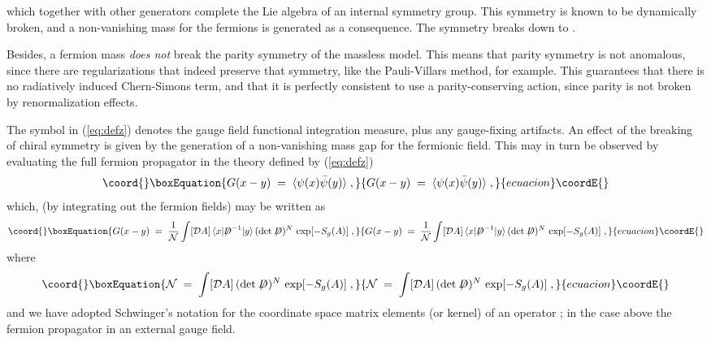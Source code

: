 \documentclass[12pt,a4paper]{article} \usepackage[latin1] {inputenc}
\begin{document}
which together with other generators complete the Lie algebra of an
internal \coordHE{} symmetry group.  This symmetry is known to be
dynamically broken\cite{Pisarski:dj}, and a non-vanishing mass for the
fermions is generated as a consequence. The \coordHE{} symmetry breaks
down to \coordHE{}.

Besides, a fermion mass {\em does not\/} break the parity symmetry of
the massless model.  This means that parity symmetry is not anomalous,
since there are regularizations that indeed preserve that symmetry,
like the Pauli-Villars method, for example.  This guarantees that
there is no radiatively induced Chern-Simons term, and that it is
perfectly consistent to use a parity-conserving action, since parity
is not broken by renormalization effects.

The symbol \myHighlight{$[{\mathcal D}A_\mu]$}\coordHE{} in (\ref{eq:defz}) denotes the gauge
field functional integration measure, plus any gauge-fixing artifacts.
An effect of the breaking of chiral symmetry is given by the
generation of a non-vanishing mass gap \myHighlight{$\Sigma$}\coordHE{} for the fermionic
field. This may in turn be observed by evaluating the full fermion
propagator \coordHE{} in the theory defined by (\ref{eq:defz})
\begin{equation}\coord{}\boxEquation{\label{eq:defg}
G(x-y) \;=\; \langle \psi (x) {\bar\psi}(y) \rangle  \;,
}{G(x-y) \;=\; \langle \psi (x) {\bar\psi}(y) \rangle  \;,
}{ecuacion}\coordE{}\end{equation}
which, (by integrating out the fermion fields) may be written as
\begin{equation}\coord{}\boxEquation{\label{eq:defg1}
G(x-y) \;=\; \frac{1}{{\mathcal N}} \int [{\mathcal D}A] \,
\langle x| {\not \!\! D}^{-1} |y \rangle \, (\det \not \!\! D)^N \,
\exp [ - S_g(A) ] \;,
}{G(x-y) \;=\; \frac{1}{{\mathcal N}} \int [{\mathcal D}A] \,
\langle x| {\not \!\! D}^{-1} |y \rangle \, (\det \not \!\! D)^N \,
\exp [ - S_g(A) ] \;,
}{ecuacion}\coordE{}\end{equation}
where
\begin{equation}\coord{}\boxEquation{\label{eq:defg2}
{\mathcal N}\;=\;  \int [{\mathcal D}A] \, (\det \not \!\! D)^N \,
\exp [ - S_g(A) ] \;,
}{{\mathcal N}\;=\;  \int [{\mathcal D}A] \, (\det \not \!\! D)^N \,
\exp [ - S_g(A) ] \;,
}{ecuacion}\coordE{}\end{equation}
and we have adopted Schwinger's notation \mbox{\coordHE{}} for the coordinate space matrix elements (or kernel) of an
operator \coordHE{}; in the case above the fermion propagator in an external
gauge field.
\end{document}
